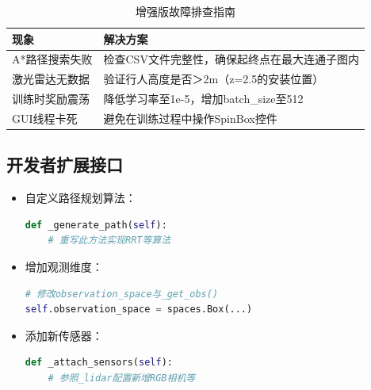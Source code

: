 \begin{table}[H]
\centering
\renewcommand{\arraystretch}{1.3}
\caption{增强版故障排查指南}
\begin{tabular}{
  >{\centering\arraybackslash}p{6cm}
  >{\centering\arraybackslash}p{9cm}
}
\toprule
\textbf{现象} & \textbf{解决方案} \\
\midrule
A*路径搜索失败 & 检查CSV文件完整性，确保起终点在最大连通子图内 \\
激光雷达无数据 & 验证行人高度是否＞2m（z=2.5的安装位置） \\
训练时奖励震荡 & 降低学习率至1e-5，增加batch\_size至512 \\
GUI线程卡死 & 避免在训练过程中操作SpinBox控件 \\
\bottomrule
\end{tabular}
\end{table}

\subsection{开发者扩展接口}
\begin{itemize}
\item 自定义路径规划算法：
\begin{lstlisting}[language=Python]
def _generate_path(self):
    # 重写此方法实现RRT等算法
\end{lstlisting}
\item 增加观测维度：
\begin{lstlisting}[language=Python]
# 修改observation_space与_get_obs()
self.observation_space = spaces.Box(...) 
\end{lstlisting}
\item 添加新传感器：
\begin{lstlisting}[language=Python]
def _attach_sensors(self):
    # 参照_lidar配置新增RGB相机等
\end{lstlisting}
\end{itemize}

